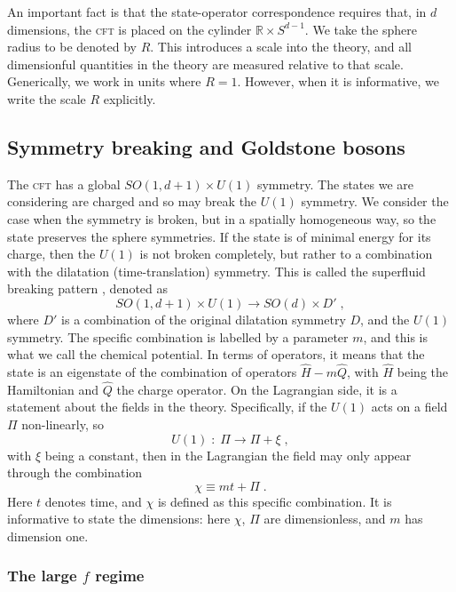 \documentclass[11pt]{article}
\numberwithin{equation}{section}
\newcommand{\be}{\begin{equation}} \newcommand{\ee}{\end{equation}}
\begin{document}
An important fact is that the state-operator correspondence requires that, in $d$ dimensions, the \textsc{cft} is placed on the cylinder \(\mathbb{R} \times S^{d-1}\). We take the sphere radius to be denoted by $R$. This introduces a scale into the theory, and all dimensionful quantities in the theory are measured relative to that scale. Generically, we work in units where $R=1$. However, when it is informative, we write the scale $R$ explicitly.

\subsection{Symmetry breaking and Goldstone bosons}
\label{sec:sbgb}

The \textsc{cft} has a global $SO(1,d+1)\times U(1)$ symmetry. The states we are considering are charged and so may break the $U(1)$ symmetry. We consider the case when the symmetry is broken, but in a spatially homogeneous way, so the state preserves the sphere symmetries. If the state is of minimal energy for its charge, then the $U(1)$ is not broken completely, but rather to a combination with the dilatation (time-translation) symmetry. This is called the superfluid breaking pattern \cite{Monin:2016jmo}, denoted as
\be
SO(1,d+1)\times U(1) \rightarrow SO(d) \times D' \;,
\ee 
where $D'$ is a combination of the original dilatation symmetry $D$, and the $U(1)$ symmetry. The specific combination is labelled by a parameter $m$, and this is what we call the chemical potential. In terms of operators, it means that the state is an eigenstate of the combination of operators $\hat{H} - m \hat{Q}$, with $\hat{H}$ being the Hamiltonian and $\hat{Q}$ the charge operator. On the Lagrangian side, it is a statement about the fields in the theory. Specifically, if the $U(1)$ acts on a field $\Pi$ non-linearly, so
\be
U(1) \;:\; \Pi \rightarrow \Pi + \xi \;,
\label{u1xi}
\ee
with $\xi$ being a constant, then in the Lagrangian the field may only appear through the combination 
\be
\chi \equiv m t + \Pi \;.
\label{chiPi}
\ee
Here $t$ denotes time, and $\chi$ is defined as this specific combination. It is informative to state the dimensions: here $\chi$, $\Pi$ are dimensionless, and $m$ has dimension one. 

\subsubsection{The large $f$ regime}
\label{sec:lfr}
\end{document}
